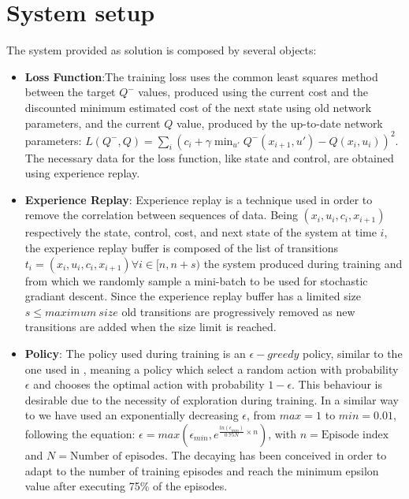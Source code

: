\documentclass[twocolumn, a4paper]{article}
\begin{document}
\section{System setup}
The system provided as solution is composed by several objects:
\begin{itemize}
	\item \textbf{Loss Function}:The training loss uses the common least
		  squares method between the target \(Q^{-}\) values, produced using
		  the current cost and the discounted minimum estimated cost of the
		  next state using old network parameters, and the current \(Q\) value,
		  produced by the up-to-date network parameters:
		  \(L(Q^{-},Q)=\sum_{i}(c_{i}+\gamma\min_{u'}Q^{-}(x_{i+1},u')-Q(x_{i},
		  u_{i}))^{2}\). The necessary data for the loss function, like state
		  and control, are obtained using experience replay.
	\item \textbf{Experience Replay}: Experience replay is a technique used in
		  order to remove the correlation between sequences of data. Being
		  \((x_{i}, u_{i}, c_{i}, x_{i+1})\) respectively the state, control,
		  cost, and next state of the system at time \(i\), the experience
		  replay buffer is composed of the list of transitions
		  \({t_{i}=(x_{i}, u_{i}, c_{i}, x_{i+1}) \forall i\in [n, n+s)}\)
		  the system produced during training and from which we randomly
		  sample a mini-batch to be used for stochastic gradiant descent.
		  Since the experience replay buffer has a limited size
		  \(s\leq maximum\:size\) old transitions are progressively removed as
		  new transitions are added when the size limit is reached.
	\item \textbf{Policy}: The policy used during training is an
		  \(\epsilon-greedy\) policy, similar to the one used in \cite{Mnih},
		  meaning a policy which select a random action with probability
		  \(\epsilon\) and chooses the optimal action with probability
		  \(1-\epsilon\). This behaviour is desirable due to the necessity of
		  exploration during training. In a similar way to \cite{Mnih} we have
		  used an exponentially decreasing \(\epsilon\), from \(max=1\) to
		  \(min=0.01\), following the equation:
		  \(\epsilon=max(\epsilon_{min},e^{\frac{ln(\epsilon_{min})}{0.75N}\times n})\), with
		  \(n=\text{Episode index}\) and \(N=\text{Number of episodes}\).
		  The decaying has been conceived in order to adapt to the number of
		  training episodes and reach the minimum epsilon value after executing
		  75\% of the episodes.
\end{itemize}
\end{document}
